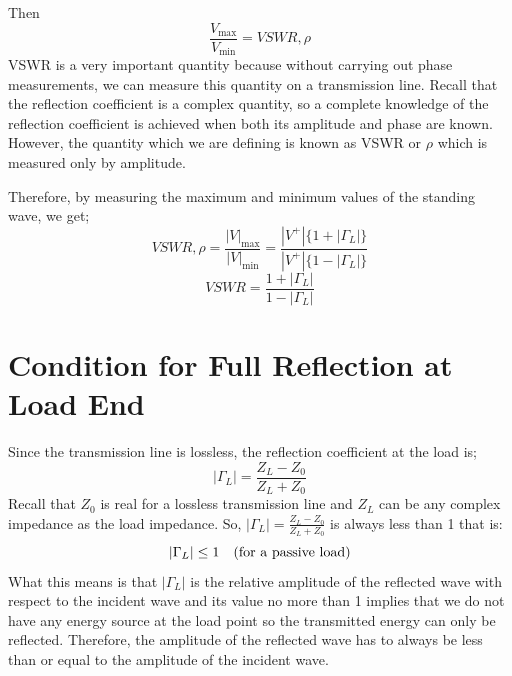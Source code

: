 Then 
\[\dfrac{V_{\max}}{V_{\min}}= VSWR, \rho\] 
VSWR is a very important quantity because without carrying out phase measurements, we can measure this quantity on a transmission line. Recall that the reflection coefficient is a complex quantity, so a complete knowledge of the reflection coefficient is achieved when both its amplitude and phase are known. However, the quantity which we are defining is known as VSWR or \(\rho\) which is measured only by amplitude.

Therefore, by measuring the maximum and minimum values of the standing wave, we get;
\begin{dmath*}
VSWR, \rho =\frac{|V|_{\max}}{|V|_{\min}} = \frac{|V^+|\{1+|\Gamma_L|\}}{|V^+|\{1-|\Gamma_L|\}}
\end{dmath*}
\begin{equation}
VSWR = \frac{1+|\Gamma_L|}{1-|\Gamma_L|}
\label{eqn:vswr}	
\end{equation}

\section{Condition for Full Reflection at Load End}
Since the transmission line is lossless, the reflection coefficient at the load is;
\begin{equation*}
|\Gamma_L| = \frac{Z_L-Z_0}{Z_L+Z_0}
\end{equation*}
Recall that $Z_0$ is real for a lossless transmission line and $Z_L$ can be any complex impedance as the load impedance. So, $|\Gamma_L| = \frac{Z_L-Z_0}{Z_L+Z_0}$ is always less than 1 that is:
\begin{equation*}
|\Gamma_L|\leq 1\quad (\textnormal{for a passive load})
\end{equation*}
What this means is that $|\Gamma_L|$ is the relative amplitude of the reflected wave with respect to the incident wave and its value no more than 1 implies that we do not have any energy source at the load point so the transmitted energy can only be reflected. Therefore, the amplitude of the reflected wave has to always be less than or equal to the amplitude of the incident wave.

